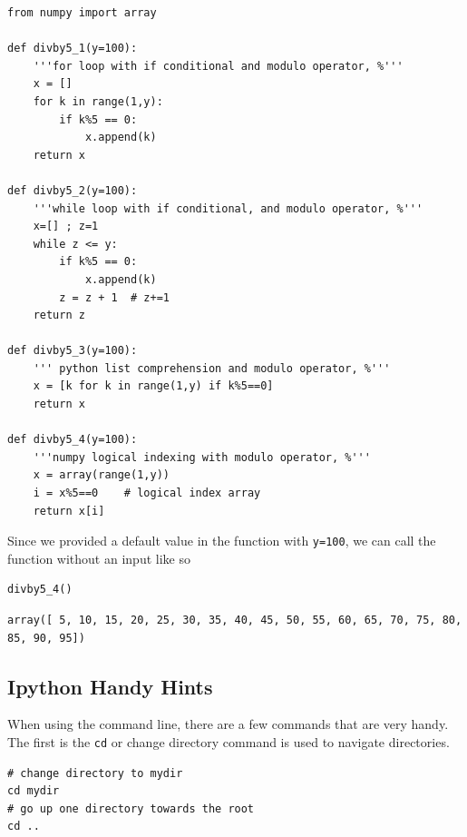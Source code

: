 \documentclass[%
oneside,                 %
final,                   %
10pt]{article}
\begin{document}
\begin{verbatim}
from numpy import array

def divby5_1(y=100):
    '''for loop with if conditional and modulo operator, %'''
    x = []
    for k in range(1,y):
        if k%5 == 0:
            x.append(k)
    return x

def divby5_2(y=100):
    '''while loop with if conditional, and modulo operator, %'''
    x=[] ; z=1
    while z <= y:
        if k%5 == 0:
            x.append(k)
        z = z + 1  # z+=1
    return z

def divby5_3(y=100):
    ''' python list comprehension and modulo operator, %'''
    x = [k for k in range(1,y) if k%5==0]
    return x

def divby5_4(y=100):
    '''numpy logical indexing with modulo operator, %'''
    x = array(range(1,y))
    i = x%5==0    # logical index array
    return x[i]
\end{verbatim}

Since we provided a default value in the function with \texttt{y=100}, we can call the function without an input like so

\begin{verbatim}
divby5_4()
\end{verbatim}

\begin{verbatim}
array([ 5, 10, 15, 20, 25, 30, 35, 40, 45, 50, 55, 60, 65, 70, 75, 80, 85, 90, 95])
\end{verbatim}

\subsection{Ipython Handy Hints}

When using the command line, there are a few commands that are very handy. The first is the \texttt{cd} or change directory command is used to navigate directories.

\begin{verbatim}
# change directory to mydir
cd mydir
# go up one directory towards the root
cd ..
\end{verbatim}
\end{document}
